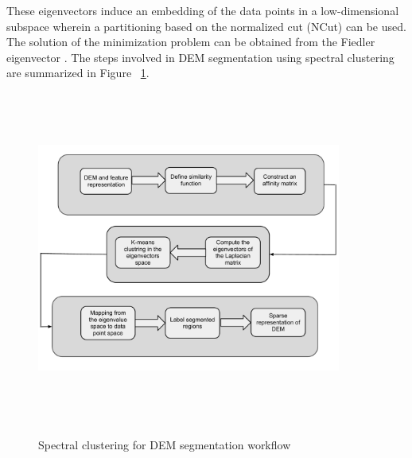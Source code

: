 \documentclass[12pt,letterpaper]{article}
\begin{document}
These eigenvectors induce an embedding of the data points in a low-dimensional subspace wherein a
partitioning based on the normalized cut (NCut) can be used. The solution of the minimization problem can be 
obtained from the Fiedler eigenvector \citep{Stella2003}.
 The steps involved in DEM segmentation using spectral clustering are summarized in Figure ~\ref{fig:fig2}.
\begin{figure}[ht!]
\center
      \includegraphics[width=10cm,height=11cm,keepaspectratio]{figs/Spectral_flow.pdf}\\
  \caption{Spectral clustering for DEM segmentation workflow}\label{fig:fig2}
\end{figure}
 
\end{document}
